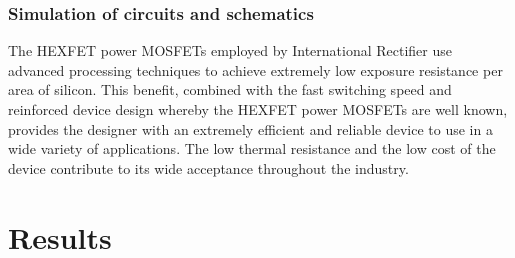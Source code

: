 \documentclass[letterpaper,12pt,twoside]{articleingud}
\begin{document}
\subsubsection{Simulation of circuits and schematics}
The HEXFET power MOSFETs employed by International Rectifier use advanced processing techniques to achieve extremely low exposure resistance per area of silicon. This benefit, combined with the fast switching speed and reinforced device design whereby the HEXFET power MOSFETs are well known, provides the designer with an extremely efficient and reliable device to use in a wide variety of applications. The low thermal resistance and the low cost of the device contribute to its wide acceptance throughout the industry.

\section{Results}
\end{document}
